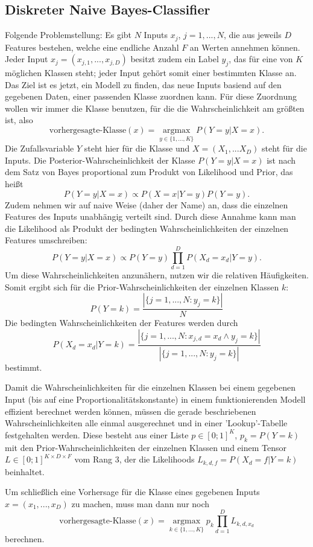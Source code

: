 \documentclass{article}
\begin{document}
\subsection{Diskreter Naive Bayes-Classifier}
Folgende Problemstellung: Es gibt \(N\) Inputs \(x_j\), \(j=1,...,N\), die aus jeweils \(D\) Features bestehen, welche eine endliche Anzahl \(F\) an Werten annehmen können. Jeder Input \(x_j=(x_{j,1},...,x_{j,D})\) besitzt zudem ein Label \(y_j\), das für eine von \(K\) möglichen Klassen steht; jeder Input gehört somit einer bestimmten Klasse an. Das Ziel ist es jetzt, ein Modell zu finden, das neue Inputs basiend auf den gegebenen Daten, einer passenden Klasse zuordnen kann. Für diese Zuordnung wollen wir immer die Klasse benutzen, für die die Wahrscheinlichkeit am größten ist, also\[
\text{vorhergesagte-Klasse}(x)=\underset{y\in\{1,...,K\}}{\operatorname{argmax}}P(Y=y|X=x).
\]Die Zufallsvariable \(Y\) steht hier für die Klasse und \(X=(X_1,...X_D)\) steht für die Inputs. Die Posterior-Wahrscheinlichkeit der Klasse \(P(Y=y|X=x)\) ist nach dem Satz von Bayes proportional zum Produkt von Likelihood und Prior, das heißt\[
P(Y=y|X=x)\propto P(X=x|Y=y)P(Y=y).
\]Zudem nehmen wir auf naive Weise (daher der Name) an, dass die einzelnen Features des Inputs unabhängig verteilt sind. Durch diese Annahme kann man die Likelihood als Produkt der bedingten Wahrscheinlichkeiten der einzelnen Features umschreiben:\[
P(Y=y|X=x)\propto P(Y=y)\prod\limits_{d=1}^D P(X_d=x_d|Y=y).
\]Um diese Wahrscheinlichkeiten anzunähern, nutzen wir die relativen Häufigkeiten. Somit ergibt sich für die Prior-Wahrscheinlichkeiten der einzelnen Klassen \(k\):
\[
P(Y=k)=\frac{|\{ j=1,...,N:y_j=k \}|}{N}
\]Die bedingten Wahrscheinlichkeiten der Features werden durch\[
P(X_d=x_d|Y=k)=\frac{|\{ j=1,...,N:x_{j,d}=x_d\land y_j=k \}|}{|\{ j=1,...,N:y_j=k \}|}
\]bestimmt.

Damit die Wahrscheinlichkeiten für die einzelnen Klassen bei einem gegebenen Input (bis auf eine Proportionalitätskonstante) in einem funktionierenden Modell effizient berechnet werden können, müssen die gerade beschriebenen Wahrscheinlichkeiten alle einmal ausgerechnet und in einer 'Lookup'-Tabelle festgehalten werden. Diese besteht aus einer Liste \(p\in[0;1]^K\), \(p_k=P(Y=k)\) mit den Prior-Wahrscheinlichkeiten der einzelnen Klassen und einem Tensor \(L\in[0;1]^{K\times D\times F}\) vom Rang 3, der die Likelihoods \(L_{k,d,f}=P(X_d=f|Y=k)\) beinhaltet. 

Um schließlich eine Vorhersage für die Klasse eines gegebenen Inputs \(x=(x_1,...,x_D)\) zu machen, muss man dann nur noch\[
    \text{vorhergesagte-Klasse}(x)=\underset{k\in\{1,...,K\}}{\operatorname{argmax}}p_k\prod\limits_{d=1}^DL_{k,d,x_d}
\]berechnen.
\end{document}
